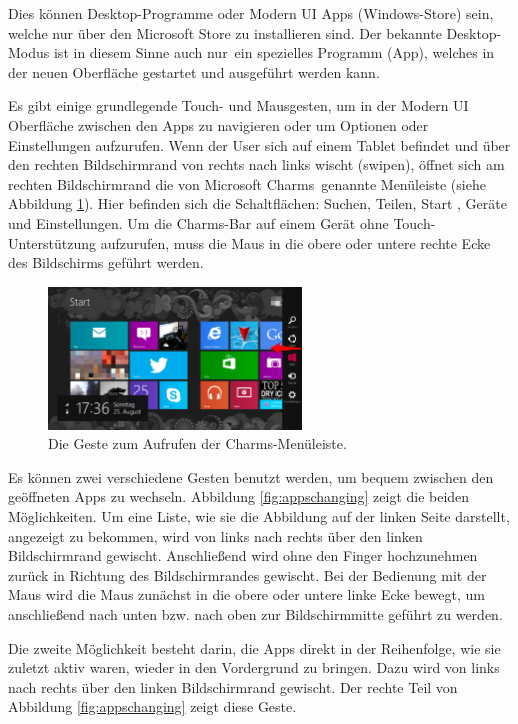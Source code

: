 \documentclass[12pt,a4paper,bibtotoc,abstracton]{scrartcl}
\begin{document}
Dies können Desktop-Programme oder Modern UI Apps (Windows-Store) sein, welche nur über den Microsoft Store zu installieren sind. Der bekannte Desktop-Modus ist in diesem Sinne auch \glqq nur\grqq\ ein spezielles Programm (App), welches in der neuen Oberfläche gestartet und ausgeführt werden kann.

Es gibt einige grundlegende Touch- und Mausgesten, um in der Modern UI Oberfläche zwischen den Apps zu navigieren oder um Optionen oder Einstellungen aufzurufen. Wenn der User sich auf einem Tablet befindet und über den rechten Bildschirmrand von rechts nach links wischt (swipen), öffnet sich am rechten Bildschirmrand die von Microsoft \glqq Charms\grqq\ genannte Menüleiste (siehe Abbildung \ref{fig:charms}). Hier befinden sich die Schaltflächen: Suchen, Teilen, Start , Geräte und Einstellungen. Um die Charms-Bar auf einem Gerät ohne Touch-Unterstützung aufzurufen, muss die Maus in die obere oder untere rechte Ecke des Bildschirms geführt werden. 

\begin{figure}[h]	
	\centering
	\includegraphics[width=0.6\textwidth]{Bilder/Screenshots/windows8/charm_bar.png} 
	\caption{Die Geste zum Aufrufen der Charms-Menüleiste.}
	\label{fig:charms}
\end{figure}  

Es können zwei verschiedene Gesten benutzt werden, um bequem zwischen den geöffneten Apps zu wechseln. Abbildung \ref{fig:appschanging} zeigt die beiden Möglichkeiten. Um eine Liste, wie sie die Abbildung auf der linken Seite darstellt, angezeigt zu bekommen, wird von links nach rechts über den linken Bildschirmrand gewischt. Anschließend wird ohne den Finger hochzunehmen zurück in Richtung des Bildschirmrandes gewischt. Bei der Bedienung mit der Maus wird die Maus zunächst in die obere oder untere linke Ecke bewegt, um anschließend nach unten bzw. nach oben zur Bildschirmmitte geführt zu werden.

Die zweite Möglichkeit besteht darin, die Apps direkt in der Reihenfolge, wie sie zuletzt aktiv waren, wieder in den Vordergrund zu bringen. Dazu wird von links nach rechts über den linken Bildschirmrand gewischt. Der rechte Teil von Abbildung \ref{fig:appschanging} zeigt diese Geste.
 
\end{document}
